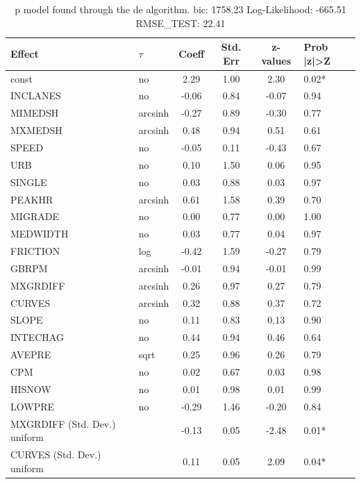 \begin{table}
	\caption{p model found through the de algorithm. bic: 1758.23 Log-Likelihood: -665.51 RMSE_TEST: 22.41}
	\begin{center}
		\begin{tabular}{|l|l|c|c|c|l|}
			\hline
			Effect & $\tau$ & Coeff & Std. Err & z-values & Prob |z|>Z \\
			\hline
			const & no & 2.29 & 1.00 & 2.30 & 0.02* \\
			\hline
			INCLANES & no & -0.06 & 0.84 & -0.07 & 0.94 \\
			\hline
			MIMEDSH & arcsinh & -0.27 & 0.89 & -0.30 & 0.77 \\
			\hline
			MXMEDSH & arcsinh & 0.48 & 0.94 & 0.51 & 0.61 \\
			\hline
			SPEED & no & -0.05 & 0.11 & -0.43 & 0.67 \\
			\hline
			URB & no & 0.10 & 1.50 & 0.06 & 0.95 \\
			\hline
			SINGLE & no & 0.03 & 0.88 & 0.03 & 0.97 \\
			\hline
			PEAKHR & arcsinh & 0.61 & 1.58 & 0.39 & 0.70 \\
			\hline
			MIGRADE & no & 0.00 & 0.77 & 0.00 & 1.00 \\
			\hline
			MEDWIDTH & no & 0.03 & 0.77 & 0.04 & 0.97 \\
			\hline
			FRICTION & log & -0.42 & 1.59 & -0.27 & 0.79 \\
			\hline
			GBRPM & arcsinh & -0.01 & 0.94 & -0.01 & 0.99 \\
			\hline
			MXGRDIFF & arcsinh & 0.26 & 0.97 & 0.27 & 0.79 \\
			\hline
			CURVES & arcsinh & 0.32 & 0.88 & 0.37 & 0.72 \\
			\hline
			SLOPE & no & 0.11 & 0.83 & 0.13 & 0.90 \\
			\hline
			INTECHAG & no & 0.44 & 0.94 & 0.46 & 0.64 \\
			\hline
			AVEPRE & sqrt & 0.25 & 0.96 & 0.26 & 0.79 \\
			\hline
			CPM & no & 0.02 & 0.67 & 0.03 & 0.98 \\
			\hline
			HISNOW & no & 0.01 & 0.98 & 0.01 & 0.99 \\
			\hline
			LOWPRE & no & -0.29 & 1.46 & -0.20 & 0.84 \\
			\hline
			MXGRDIFF (Std. Dev.) uniform &  & -0.13 & 0.05 & -2.48 & 0.01* \\
			\hline
			CURVES (Std. Dev.) uniform &  & 0.11 & 0.05 & 2.09 & 0.04* \\

\end{tabular}
\end{center}
\end{table}
